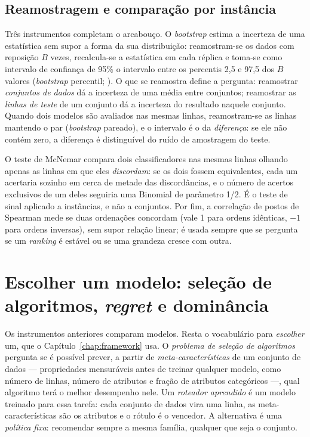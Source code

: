 \subsection{Reamostragem e comparação por instância}
\label{sec:fund-reamostragem}

Três instrumentos completam o arcabouço. O \emph{bootstrap} estima a
incerteza de uma estatística sem supor a forma da sua distribuição:
reamostram-se os dados com reposição $B$ vezes, recalcula-se a
estatística em cada réplica e toma-se como intervalo de confiança de
95\% o intervalo entre os percentis 2,5 e 97,5 dos $B$ valores
(\emph{bootstrap} percentil; \citealp{efron1993}). O que se
reamostra define a pergunta: reamostrar \emph{conjuntos de dados} dá
a incerteza de uma média entre conjuntos; reamostrar as \emph{linhas
de teste} de um conjunto dá a incerteza do resultado naquele conjunto.
Quando dois modelos são avaliados nas mesmas linhas, reamostram-se as
linhas mantendo o par (\emph{bootstrap} pareado), e o intervalo é o
da \emph{diferença}: se ele não contém zero, a diferença é
distinguível do ruído de amostragem do teste.

O teste de McNemar \citep{mcnemar1947} compara dois classificadores
nas mesmas linhas olhando apenas as linhas em que eles
\emph{discordam}: se os dois fossem equivalentes, cada um acertaria
sozinho em cerca de metade das discordâncias, e o número de acertos
exclusivos de um deles seguiria uma Binomial de parâmetro 1/2. É o
teste de sinal aplicado a instâncias, e não a conjuntos. Por fim, a
correlação de postos de Spearman mede se duas ordenações concordam
(vale 1 para ordens idênticas, $-1$ para ordens inversas), sem supor
relação linear; é usada sempre que se pergunta se um \emph{ranking} é
estável ou se uma grandeza cresce com outra.

\section{Escolher um modelo: seleção de algoritmos, \emph{regret} e
dominância}
\label{sec:fund-selecao}

Os instrumentos anteriores comparam modelos. Resta o vocabulário para
\emph{escolher} um, que o Capítulo~\ref{chap:framework} usa. O
\emph{problema de seleção de algoritmos} \citep{rice1976} pergunta
se é possível prever, a partir de \emph{meta-características} de um
conjunto de dados --- propriedades mensuráveis antes de treinar
qualquer modelo, como número de linhas, número de atributos e fração
de atributos categóricos ---, qual algoritmo terá o melhor desempenho
nele. Um \emph{roteador aprendido} é um modelo treinado para essa
tarefa: cada conjunto de dados vira uma linha, as meta-características
são os atributos e o rótulo é o vencedor. A alternativa é uma
\emph{política fixa}: recomendar sempre a mesma família, qualquer que
seja o conjunto.

